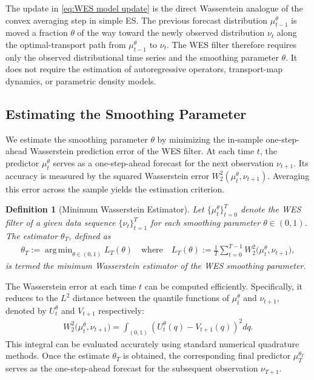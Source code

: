 \documentclass[a4paper, 11pt]{article}
\DeclareMathOperator*{\argmin}{arg\,min}
\newtheorem{definition}{Definition}
\theoremstyle{definition}
\begin{document}
The update in \eqref{eq:WES model update} is the direct Wasserstein analogue of the convex averaging step in simple ES.
The previous forecast distribution $\mu_{t-1}^{\theta}$ is moved a fraction $\theta$ of the way toward the newly observed distribution $\nu_t$ along the optimal-transport path from $\mu_{t-1}^{\theta}$ to $\nu_t$.
The WES filter therefore requires only the observed distributional time series and the smoothing parameter $\theta$.
It does not require the estimation of autoregressive operators, transport-map dynamics, or parametric density models.

\subsection{Estimating the Smoothing Parameter}

We estimate the smoothing parameter $\theta$ by minimizing the in-sample one-step-ahead Wasserstein prediction error of the WES filter.
At each time $t$, the predictor $\mu_t^{\theta}$ serves as a one-step-ahead forecast for the next observation $\nu_{t+1}$. 
Its accuracy is measured by the squared Wasserstein error $W_2^2( \mu_t^{\theta}, \nu_{t+1} )$.
Averaging this error across the sample yields the estimation criterion.

\begin{definition}[Minimum Wasserstein Estimator] \label{def:minimum_Wasserstein_estimator}
    Let $\{ \mu_t^\theta \}_{t=0}^{T}$ denote the WES filter of a given data sequence $\{ \nu_t \}_{t=1}^{T}$ for each smoothing parameter $\theta \in (0, 1)$.
	The estimator $\theta_T$, defined as
	\begin{align}\label{eq:Minimum Wasserstein Estimator}
		\theta_T := \argmin_{\theta \in (0, 1)} L_T(\theta) \quad \text{where} \quad L_T(\theta) := \frac{1}{T} \sum_{t=0}^{T-1} W_2^2\big( \mu_t^{\theta}, \nu_{t+1} \big) ,
	\end{align}
    is termed the minimum Wasserstein estimator of the WES smoothing parameter.
\end{definition}

The Wasserstein error at each time $t$ can be computed efficiently.
Specifically, it reduces to the $L^2$ distance between the quantile functions of $\mu_t^{\theta}$ and $\nu_{t+1}$, denoted by $U_t^\theta$ and $V_{t+1}$ respectively:
\begin{align}
	W_2^2\big( \mu_t^{\theta}, \nu_{t+1} \big) = \int_{(0,1)} \left( U_t^\theta(q) - V_{t+1}(q) \right)^2 dq .
\end{align}
This integral can be evaluated accurately using standard numerical quadrature methods.
Once the estimate $\theta_T$ is obtained, the corresponding final predictor $\mu_T^{\theta_T}$ serves as the one-step-ahead forecast for the subsequent observation $\nu_{T+1}$.
\end{document}
